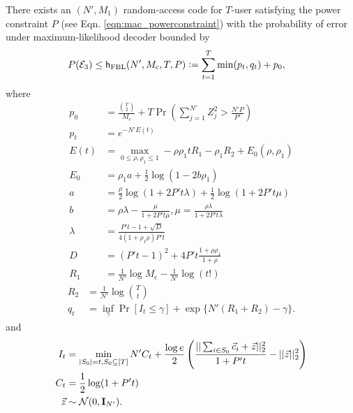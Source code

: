 \begin{lemma}
There exists an $(N',M_1)$ random-access code for $T$-user satisfying the power constraint $P$ (see Eqn. \eqref{eqn:mac_powerconstraint}) with the probability of error under maximum-likelihood decoder bounded by
\begin{align}
P (\mathcal{E}_3)&\leq \mathsf{h}_{\text{FBL}}(N',M_\mathrm{c},T,P)\mathrel{\mathop:}=	\sum_{t=1}^{T} \min(p_t,q_t)+p_0,
\label{eqn:FBLbounds}
\end{align}
where
\begin{align*}
p_0 &=\frac{\binom{T}{2}}{M_\mathrm{c}}+T \Pr\left(\sum_{j=1}^{N'} Z_j^2>\frac{N'P}{P'}\right)\\
p_t&=e^{-N'E(t)}\\
E(t)&=\max_{0\leq \rho,\rho_1\leq 1}-\rho\rho_1tR_1-\rho_1R_2+E_0(\rho,\rho_1)\\
E_0&=\rho_1 a+\frac{1}{2}\log (1-2b\rho_1)\\
a&=\frac{\rho}{2}\log(1+2P't\lambda)+\frac{1}{2}\log(1+2P't\mu)\\
b&=\rho\lambda-\frac{\mu}{1+2P't\mu},\mu=\frac{\rho\lambda}{1+2P't\lambda}\\
\lambda&=\frac{P't-1+\sqrt{D}}{4(1+\rho_1\rho)P't}\\
D&=(P't-1)^2+4P't\frac{1+\rho\rho_1}{1+\rho}\\
R_1&=\frac{1}{N'}\log M_\mathrm{c}-\frac{1}{N'}\log(t!)
\end{align*}
\begin{align*}
R_2&=\frac{1}{N'}\log \binom{T}{t}\\
q_t&=\inf_\gamma \Pr[I_t\leq \gamma]+\exp\{N'(R_1+R_2)-\gamma\}.
\end{align*}
and
\begin{align*}
I_t&=\min_{|S_0|=t,S_0\subseteq [T]}N'C_t+\frac{\log e}{2}\left(\frac{||\sum_{i\in S_0} \vec{c}_i+\vec{z}||_2^2}{1+P't}-||\vec{z}||_2^2\right)\\
C_t &=\frac{1}{2}\log (1+P't)\\
\vec{z}&\sim \mathcal{N}(0,\mathbf{I}_{N'}).
\end{align*}
\end{lemma}

